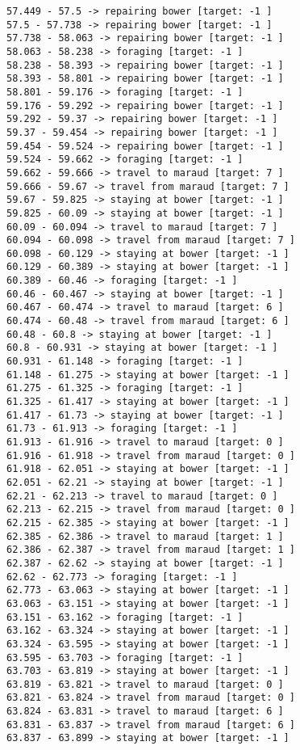 \documentclass[11pt]{article}
\begin{document}
\begin{Verbatim}[commandchars=\\\{\}]
57.449 - 57.5 -> repairing bower [target: -1 ]
57.5 - 57.738 -> repairing bower [target: -1 ]
57.738 - 58.063 -> repairing bower [target: -1 ]
58.063 - 58.238 -> foraging [target: -1 ]
58.238 - 58.393 -> repairing bower [target: -1 ]
58.393 - 58.801 -> repairing bower [target: -1 ]
58.801 - 59.176 -> foraging [target: -1 ]
59.176 - 59.292 -> repairing bower [target: -1 ]
59.292 - 59.37 -> repairing bower [target: -1 ]
59.37 - 59.454 -> repairing bower [target: -1 ]
59.454 - 59.524 -> repairing bower [target: -1 ]
59.524 - 59.662 -> foraging [target: -1 ]
59.662 - 59.666 -> travel to maraud [target: 7 ]
59.666 - 59.67 -> travel from maraud [target: 7 ]
59.67 - 59.825 -> staying at bower [target: -1 ]
59.825 - 60.09 -> staying at bower [target: -1 ]
60.09 - 60.094 -> travel to maraud [target: 7 ]
60.094 - 60.098 -> travel from maraud [target: 7 ]
60.098 - 60.129 -> staying at bower [target: -1 ]
60.129 - 60.389 -> staying at bower [target: -1 ]
60.389 - 60.46 -> foraging [target: -1 ]
60.46 - 60.467 -> staying at bower [target: -1 ]
60.467 - 60.474 -> travel to maraud [target: 6 ]
60.474 - 60.48 -> travel from maraud [target: 6 ]
60.48 - 60.8 -> staying at bower [target: -1 ]
60.8 - 60.931 -> staying at bower [target: -1 ]
60.931 - 61.148 -> foraging [target: -1 ]
61.148 - 61.275 -> staying at bower [target: -1 ]
61.275 - 61.325 -> foraging [target: -1 ]
61.325 - 61.417 -> staying at bower [target: -1 ]
61.417 - 61.73 -> staying at bower [target: -1 ]
61.73 - 61.913 -> foraging [target: -1 ]
61.913 - 61.916 -> travel to maraud [target: 0 ]
61.916 - 61.918 -> travel from maraud [target: 0 ]
61.918 - 62.051 -> staying at bower [target: -1 ]
62.051 - 62.21 -> staying at bower [target: -1 ]
62.21 - 62.213 -> travel to maraud [target: 0 ]
62.213 - 62.215 -> travel from maraud [target: 0 ]
62.215 - 62.385 -> staying at bower [target: -1 ]
62.385 - 62.386 -> travel to maraud [target: 1 ]
62.386 - 62.387 -> travel from maraud [target: 1 ]
62.387 - 62.62 -> staying at bower [target: -1 ]
62.62 - 62.773 -> foraging [target: -1 ]
62.773 - 63.063 -> staying at bower [target: -1 ]
63.063 - 63.151 -> staying at bower [target: -1 ]
63.151 - 63.162 -> foraging [target: -1 ]
63.162 - 63.324 -> staying at bower [target: -1 ]
63.324 - 63.595 -> staying at bower [target: -1 ]
63.595 - 63.703 -> foraging [target: -1 ]
63.703 - 63.819 -> staying at bower [target: -1 ]
63.819 - 63.821 -> travel to maraud [target: 0 ]
63.821 - 63.824 -> travel from maraud [target: 0 ]
63.824 - 63.831 -> travel to maraud [target: 6 ]
63.831 - 63.837 -> travel from maraud [target: 6 ]
63.837 - 63.899 -> staying at bower [target: -1 ]

\end{Verbatim}
\end{document}
